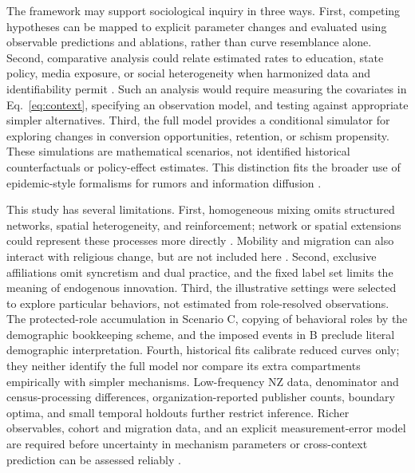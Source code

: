 \documentclass[11pt,a4paper]{article}
\begin{document}
The framework may support sociological inquiry in three ways. First, competing hypotheses can be mapped to explicit parameter changes and evaluated using observable predictions and ablations, rather than curve resemblance alone. Second, comparative analysis could relate estimated rates to education, state policy, media exposure, or social heterogeneity when harmonized data and identifiability permit \cite{rogers2003diffusion,norrisInglehart2012sacred}. Such an analysis would require measuring the covariates in Eq.~\eqref{eq:context}, specifying an observation model, and testing against appropriate simpler alternatives. Third, the full model provides a conditional simulator for exploring changes in conversion opportunities, retention, or schism propensity. These simulations are mathematical scenarios, not identified historical counterfactuals or policy-effect estimates. This distinction fits the broader use of epidemic-style formalisms for rumors and information diffusion \cite{daleyKendall1965rumours,kabir2019analysis,zhao2013sir,rui2018spir,matsumoto2025information}.

This study has several limitations. First, homogeneous mixing omits structured networks, spatial heterogeneity, and reinforcement; network or spatial extensions could represent these processes more directly \cite{centolaMacy2007complex,zheng2023spatiotemporal,mahmood2022modeling}. Mobility and migration can also interact with religious change, but are not included here \cite{intro_21,ng2022muslim}. Second, exclusive affiliations omit syncretism and dual practice, and the fixed label set limits the meaning of endogenous innovation. Third, the illustrative settings were selected to explore particular behaviors, not estimated from role-resolved observations. The protected-role accumulation in Scenario C, copying of behavioral roles by the demographic bookkeeping scheme, and the imposed events in B preclude literal demographic interpretation. Fourth, historical fits calibrate reduced curves only; they neither identify the full model nor compare its extra compartments empirically with simpler mechanisms. Low-frequency NZ data, denominator and census-processing differences, organization-reported publisher counts, boundary optima, and small temporal holdouts further restrict inference. Richer observables, cohort and migration data, and an explicit measurement-error model are required before uncertainty in mechanism parameters or cross-context prediction can be assessed reliably \cite{cavalliSforzaFeldman1981cultural,norrisInglehart2012sacred}.
\end{document}
